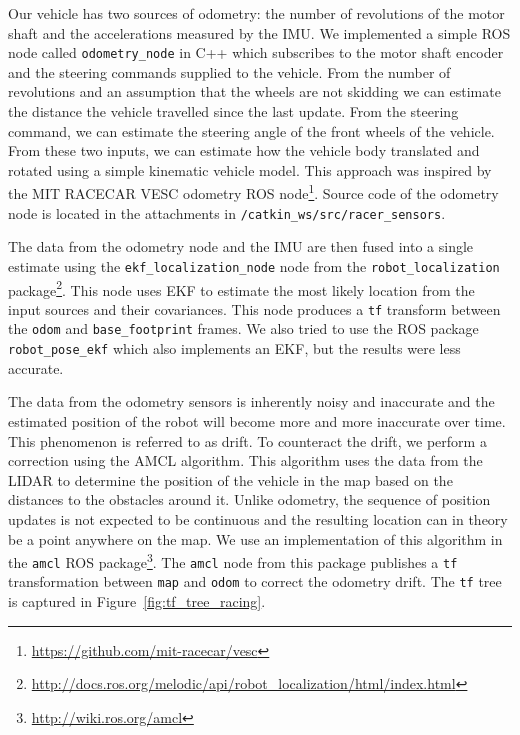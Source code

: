 Our vehicle has two sources of odometry: the number of revolutions of the motor shaft and the accelerations measured by the IMU. We implemented a simple \gls*{ROS} node called \verb|odometry_node| in C++ which subscribes to the motor shaft encoder and the steering commands supplied to the vehicle. From the number of revolutions and an assumption that the wheels are not skidding we can estimate the distance the vehicle travelled since the last update. From the steering command, we can estimate the steering angle of the front wheels of the vehicle. From these two inputs, we can estimate how the vehicle body translated and rotated using a simple kinematic vehicle model. This approach was inspired by the MIT RACECAR VESC odometry \gls*{ROS} node\footnote{\url{https://github.com/mit-racecar/vesc}}. Source code of the odometry node is located in the attachments in \texttt{/catkin\_ws/src/racer\_sensors}.

The data from the odometry node and the \gls*{IMU} are then fused into a single estimate using the \verb|ekf_localization_node| node from the \texttt{robot\_localization} package\footnote{\url{http://docs.ros.org/melodic/api/robot\_localization/html/index.html}}. This node uses \gls*{EKF} to estimate the most likely location from the input sources and their covariances. This node produces a \verb|tf| transform between the \verb|odom| and \verb|base_footprint| frames. We also tried to use the \gls*{ROS} package \texttt{robot\_pose\_ekf} which also implements an \gls*{EKF}, but the results were less accurate.

The data from the odometry sensors is inherently noisy and inaccurate and the estimated position of the robot will become more and more inaccurate over time. This phenomenon is referred to as drift. To counteract the drift, we perform a correction using the \gls*{AMCL} algorithm. This algorithm uses the data from the \gls*{LIDAR} to determine the position of the vehicle in the map based on the distances to the obstacles around it. Unlike odometry, the sequence of position updates is not expected to be continuous and the resulting location can in theory be a point anywhere on the map. We use an implementation of this algorithm in the \verb|amcl| \gls*{ROS} package\footnote{\url{http://wiki.ros.org/amcl}}. The \verb|amcl| node from this package publishes a \verb|tf| transformation between \verb|map| and \verb|odom| to correct the odometry drift. The \verb|tf| tree is captured in Figure~\ref{fig:tf_tree_racing}.

